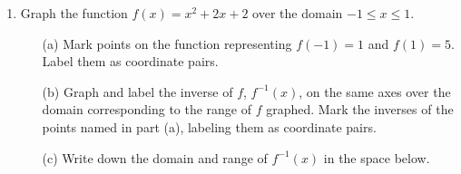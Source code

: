 \documentclass[12pt, oneside]{article}
\begin{document}
\begin{enumerate}
\newpage
    \item Graph the function $f(x)=x^2+2x+2$ over the domain $-1 \leq x\leq 1$.
    \begin{itemize}
        \item[(a)] Mark points on the function representing $f(-1)=1$ and $f(1)=5$. Label them as coordinate pairs.
    	\item[(b)] Graph and label the inverse of $f$, $f^{-1}(x)$, on the same axes over the domain corresponding to the range of $f$ graphed. Mark the inverses of the points named in part (a), labeling them as coordinate pairs.
    	\item[(c)] Write down the domain and range of $f^{-1}(x)$ in the space below. \vspace{2cm}
    \end{itemize}


  \end{enumerate}
\end{document}
